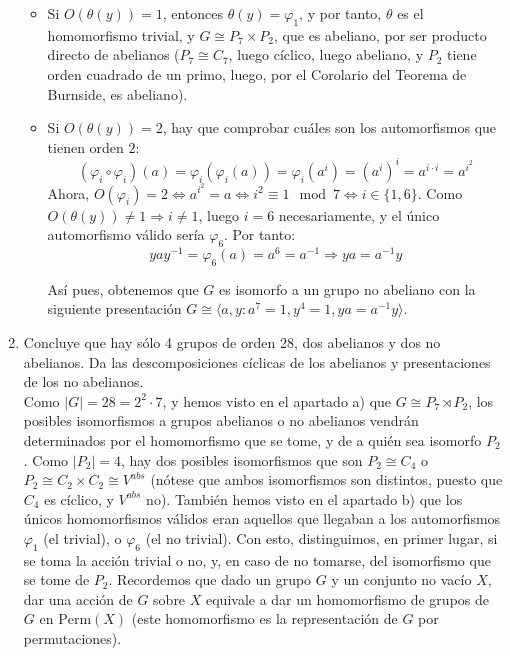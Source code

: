 \documentclass[12pt]{article}
\begin{document}
\begin{ejercicio}[2 puntos]
\begin{enumerate}[label=(\alph*)]
            \begin{itemize}
                \item Si $O(\theta(y)) = 1$, entonces $\theta(y) = \varphi_1$, y por tanto, $\theta$ es el homomorfismo trivial, y $G \cong P_7 \times P_2$, que es abeliano, por ser producto directo de abelianos ($P_7 \cong C_7$, luego cíclico, luego abeliano, y $P_2$ tiene orden cuadrado de un primo,
                luego, por el Corolario del Teorema de Burnside, es abeliano).
                \item Si $O(\theta(y)) = 2$, hay que comprobar cuáles son los automorfismos que tienen orden $2$:
                $$(\varphi_i \circ \varphi_i)(a) = \varphi_i(\varphi_i(a)) = \varphi_i(a^i) = (a^i)^i = a^{i \cdot i} = a^{i^2}$$
                Ahora, $O(\varphi_i) = 2 \iff a^{i^2} = a \iff i^2 \equiv 1 \mod 7 \iff i \in \{1,6\}$. Como $O(\theta(y)) \neq 1 \Longrightarrow i \neq 1$, luego $i=6$ necesariamente, y el único automorfismo válido sería $\varphi_6$. Por tanto:
                $$yay^{-1} = \varphi_6(a) = a^6 = a^{-1} \Longrightarrow ya = a^{-1}y$$
                
                Así pues, obtenemos que $G$ es isomorfo a un grupo no abeliano con la siguiente presentación $G \cong \langle a,y : a^7 = 1,  y^4 = 1, ya = a^{-1}y \rangle$.
            \end{itemize}

            \item Concluye que hay sólo 4 grupos de orden 28, dos abelianos y dos no abelianos. Da las descomposiciones cíclicas de los abelianos y presentaciones de los no abelianos. \\
            
            Como $|G| = 28 = 2^2 \cdot 7$, y hemos visto en el apartado a) que $G \cong P_7 \rtimes P_2$, los posibles isomorfismos a grupos abelianos o no abelianos vendrán determinados por el homomorfismo que se tome, y de a quién sea isomorfo $P_2$. Como $|P_2| = 4$, hay dos posibles isomorfismos
            que son $P_2 \cong C_4$ o $P_2 \cong C_2 \times C_2 \cong V^{abs}$ (nótese que ambos isomorfismos son distintos, puesto que $C_4$ es cíclico, y $V^{abs}$ no). También hemos visto en el apartado b) que los únicos homomorfismos válidos eran aquellos que llegaban a los automorfismos
            $\varphi_1$ (el trivial), o $\varphi_6$ (el no trivial). Con esto, distinguimos, en primer lugar, si se toma la acción trivial o no, y, en caso de no tomarse, del isomorfismo que se tome de $P_2$. Recordemos que dado un grupo $G$ y un conjunto no vacío $X$, dar una acción de $G$ sobre $X$
            equivale a dar un homomorfismo de grupos de $G$ en $\text{Perm}(X)$ (este homomorfismo es la representación de $G$ por permutaciones).
            

\end{enumerate}
\end{ejercicio}
\end{document}
